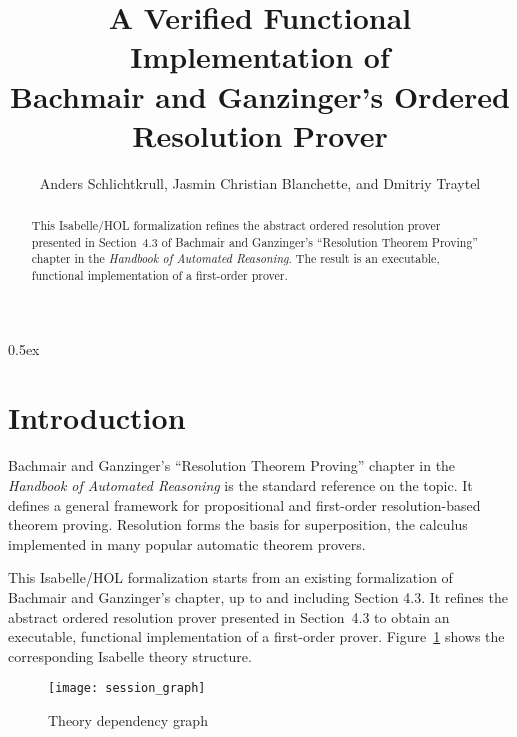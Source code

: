 \documentclass[10pt,a4paper]{article}
\begin{document}
\title{A Verified Functional Implementation of \\ Bachmair and Ganzinger's Ordered Resolution Prover}
\author{Anders Schlichtkrull, Jasmin Christian Blanchette, and Dmitriy Traytel}

\maketitle

\begin{abstract}
\noindent
This Isabelle/HOL formalization refines the abstract ordered resolution prover
presented in Section~4.3 of Bachmair and Ganzinger's ``Resolution Theorem
Proving'' chapter in the \emph{Handbook of Automated Reasoning}. The result
is an executable, functional implementation of a first-order prover.
\end{abstract}

\tableofcontents

\parindent 0pt
\parskip 0.5ex

\section{Introduction}

Bachmair and Ganzinger's ``Resolution Theorem Proving'' chapter
in the \emph{Handbook of Automated Reasoning} is the standard reference on the
topic. It defines a general framework for propositional and first-order
resolution-based theorem proving. Resolution forms the basis for
superposition, the calculus implemented in many popular automatic theorem
provers.

\medskip

This Isabelle/HOL formalization starts from an existing formalization of
Bachmair and Ganzinger's chapter, up to and including Section 4.3. It refines
the abstract ordered resolution prover presented in Section~4.3 to obtain an
executable, functional implementation of a first-order prover.
Figure~\ref{fig:thys} shows the corresponding Isabelle theory structure.

\begin{figure}
\begin{center}
  \texttt{[image: session\_graph]}
\end{center}
\caption{Theory dependency graph}
\label{fig:thys}
\end{figure}



% 
% 
\end{document}
